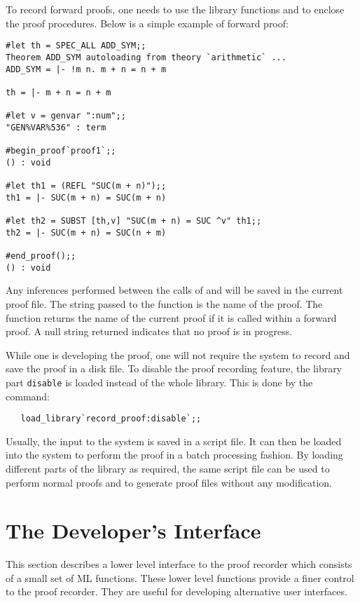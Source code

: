 To record forward proofs, one needs to use the library functions
 and  to enclose the proof
procedures. Below is a simple example of forward proof:
\begin{session}
\begin{verbatim}
#let th = SPEC_ALL ADD_SYM;;
Theorem ADD_SYM autoloading from theory `arithmetic` ...
ADD_SYM = |- !m n. m + n = n + m

th = |- m + n = n + m

#let v = genvar ":num";;
"GEN%VAR%536" : term

#begin_proof`proof1`;;
() : void

#let th1 = (REFL "SUC(m + n)");;
th1 = |- SUC(m + n) = SUC(m + n)

#let th2 = SUBST [th,v] "SUC(m + n) = SUC ^v" th1;;
th2 = |- SUC(m + n) = SUC(n + m)

#end_proof();;
() : void
\end{verbatim}
\end{session}
Any inferences performed between the calls of 
and  will be saved in the current proof file.
The string passed to the function  is the name of
the proof. The function  returns the name of the
current proof if it is called within a forward proof. A null string
returned indicates that no proof is in progress.

While one is developing the proof, one will not require
the system to record and save the proof in a disk file. To disable the
proof recording feature, the library part {\tt disable} is loaded
instead of the whole library. This is done by the command:
\begin{verbatim}
   load_library`record_proof:disable`;;
\end{verbatim}

Usually, the input to the system is saved in a script file.
It can then be loaded into the system to perform the proof in a batch
processing fashion. By loading different parts of the library as 
required, the same script file can be used to perform normal proofs and
to generate proof files without any modification.


\section{The Developer's Interface}

This section describes a lower level interface to the proof recorder
which consists of a small set of ML functions.
These lower level functions provide a finer control to the proof
recorder. They are useful for developing alternative user interfaces.


